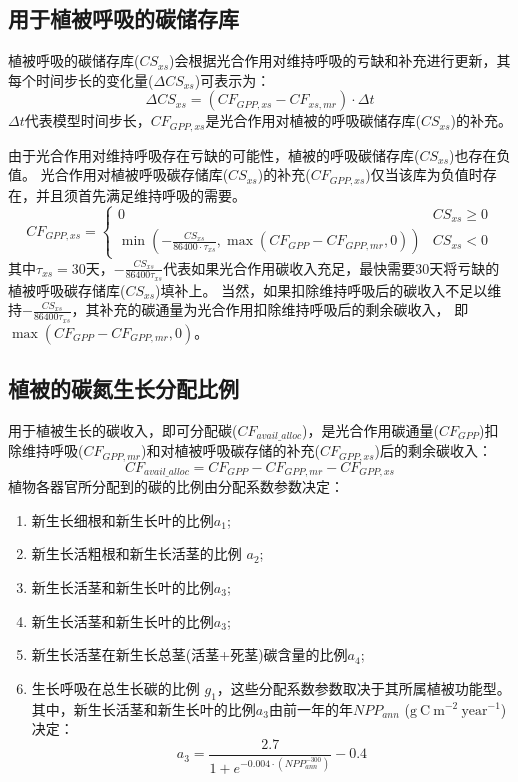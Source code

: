 \subsection{用于植被呼吸的碳储存库}
植被呼吸的碳储存库($CS_{xs}$)会根据光合作用对维持呼吸的亏缺和补充进行更新，其每个时间步长的变化量($\Delta CS_{xs}$)可表示为：
\begin{equation}
\Delta CS_{xs}=\left(CF_{GPP, xs}-CF_{xs, mr}\right) \cdot \Delta t
\end{equation}
$\Delta t$代表模型时间步长，$CF_{GPP,xs}$是光合作用对植被的呼吸碳储存库($CS_{xs}$)的补充。

由于光合作用对维持呼吸存在亏缺的可能性，植被的呼吸碳储存库($CS_{xs}$)也存在负值。
光合作用对植被呼吸碳存储库($CS_{xs}$)的补充($CF_{GPP,xs}$)仅当该库为负值时存在，并且须首先满足维持呼吸的需要。
\begin{equation}
CF_{GPP, xs}=\left\{\begin{array}{ll}0 & CS_{xs} \geq 0 \\ \min \left(-\frac{CS_{xs}}{86400 \cdot \tau_{xs}}, \max \left(CF_{GPP}-CF_{GPP, mr}, 0\right)\right) & CS_{xs}<0\end{array}\right.
\end{equation}
其中$\tau_{xs}=30$天，$-\frac{CS_{xs}}{86400 \tau_{xs}}$代表如果光合作用碳收入充足，最快需要30天将亏缺的植被呼吸碳存储库($CS_{xs}$)填补上。
当然，如果扣除维持呼吸后的碳收入不足以维持$-\frac{CS_{xs}}{86400 \tau_{xs}}$，其补充的碳通量为光合作用扣除维持呼吸后的剩余碳收入，
即$\max{\left(CF_{GPP}-CF_{GPP,mr},0\right)}$。


\subsection{植被的碳氮生长分配比例}
用于植被生长的碳收入，即可分配碳($CF_{avail\_alloc}$)，是光合作用碳通量($CF_{GPP}$)扣除维持呼吸($CF_{GPP,mr}$)和对植被呼吸碳存储的补充($CF_{GPP,xs}$)后的剩余碳收入：
\begin{equation}
CF_{ {avail\_alloc }}=CF_{GPP}-CF_{GPP, mr}-CF_{GPP, xs}
\end{equation}
植物各器官所分配到的碳的比例由分配系数参数决定：
\begin{enumerate}
  \item 新生长细根和新生长叶的比例$a_1$; 
  \item 新生长活粗根和新生长活茎的比例 $a_2$;
  \item 新生长活茎和新生长叶的比例$a_3$;
  \item 新生长活茎和新生长叶的比例$a_3$;
  \item 新生长活茎在新生长总茎(活茎+死茎)碳含量的比例$a_4$;
  \item 生长呼吸在总生长碳的比例 $g_1$，这些分配系数参数取决于其所属植被功能型。其中，新生长活茎和新生长叶的比例$a_3$由前一年的年$NPP_{ann}$ ($\mathrm{g\ C\ m^{-2}\ year^{-1}}$)决定：
    \begin{equation}
      a_{3}=\frac{2.7}{1+e^{-0.004 \cdot\left(NPP_{ann}^{-300}\right)}}-0.4
    \end{equation}
\end{enumerate}

